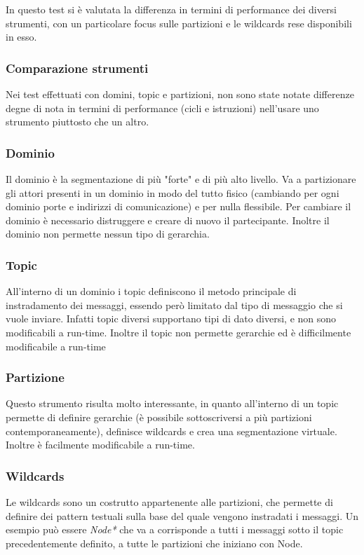 In questo test si è valutata la differenza in termini di performance dei diversi strumenti, con un particolare focus sulle partizioni e le wildcards rese disponibili in esso.

\subsubsection{Comparazione strumenti}
Nei test effettuati con domini, topic e partizioni, non sono state notate differenze degne di nota in termini di performance (cicli e istruzioni) nell'usare uno strumento piuttosto che un altro. 

\subsubsection*{Dominio} 
Il dominio è la segmentazione di più "forte" e di più alto livello. Va a partizionare gli attori presenti in un dominio in modo del tutto fisico (cambiando per ogni dominio porte e indirizzi di comunicazione) e per nulla flessibile. Per cambiare il dominio è necessario distruggere e creare di nuovo il partecipante. Inoltre il dominio non permette nessun tipo di gerarchia.
    
\subsubsection*{Topic}
All'interno di un dominio i topic definiscono il metodo principale di instradamento dei messaggi, essendo però limitato dal tipo di messaggio che si vuole inviare. Infatti topic diversi supportano tipi di dato diversi, e non sono modificabili a run-time. %
Inoltre il topic non permette gerarchie ed è difficilmente modificabile a run-time

\subsubsection*{Partizione}
Questo strumento risulta molto interessante, in quanto all'interno di un topic permette di definire gerarchie (è possibile sottoscriversi a più partizioni contemporaneamente), definisce wildcards e crea una segmentazione virtuale. Inoltre è facilmente modificabile a run-time.

\subsubsection{Wildcards}
Le wildcards sono un costrutto appartenente alle partizioni, che permette di definire dei pattern testuali sulla base del quale vengono instradati i messaggi. Un esempio può essere \textit{Node*} che va a corrisponde a tutti i messaggi sotto il topic precedentemente definito, a tutte le partizioni che iniziano con Node.

